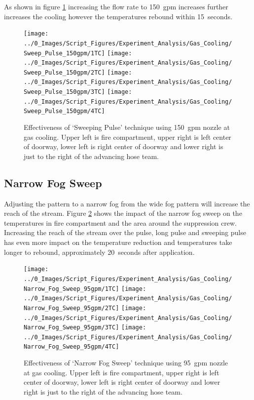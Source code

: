 \documentclass[12pt,oneside]{book}
\begin{document}
As shown in figure \ref{fig:gas_sweep_pulse_150} increasing the flow rate to 150~gpm increases further increases the cooling however the temperatures rebound within 15~seconds. 

\begin{figure}[H]
\centering
\texttt{[image: ../0\_Images/Script\_Figures/Experiment\_Analysis/Gas\_Cooling/Sweep\_Pulse\_150gpm/1TC]}
\texttt{[image: ../0\_Images/Script\_Figures/Experiment\_Analysis/Gas\_Cooling/Sweep\_Pulse\_150gpm/2TC]}
\texttt{[image: ../0\_Images/Script\_Figures/Experiment\_Analysis/Gas\_Cooling/Sweep\_Pulse\_150gpm/3TC]}
\texttt{[image: ../0\_Images/Script\_Figures/Experiment\_Analysis/Gas\_Cooling/Sweep\_Pulse\_150gpm/4TC]}
\caption[Gas Cooling - Sweeping Pulse 150~gpm]{Effectiveness of `Sweeping Pulse' technique using 150~gpm nozzle at gas cooling. Upper left is fire compartment, upper right is left center of doorway, lower left is right center of doorway and lower right is just to the right of the advancing hose team.}
\label{fig:gas_sweep_pulse_150}
\end{figure}


\subsection {Narrow Fog Sweep}
Adjusting the pattern to a narrow fog from the wide fog pattern will increase the reach of the stream. Figure \ref{fig:gas_narrow_fog_95} shows the impact of the narrow fog sweep on the temperatures in fire compartment and the area around the suppression crew. Increasing the reach of the stream over the pulse, long pulse and sweeping pulse has even more impact on the temperature reduction and temperatures take longer to rebound, approximately 20~seconds after application.

\begin{figure}[H]
\centering
\texttt{[image: ../0\_Images/Script\_Figures/Experiment\_Analysis/Gas\_Cooling/Narrow\_Fog\_Sweep\_95gpm/1TC]}
\texttt{[image: ../0\_Images/Script\_Figures/Experiment\_Analysis/Gas\_Cooling/Narrow\_Fog\_Sweep\_95gpm/2TC]}
\texttt{[image: ../0\_Images/Script\_Figures/Experiment\_Analysis/Gas\_Cooling/Narrow\_Fog\_Sweep\_95gpm/3TC]}
\texttt{[image: ../0\_Images/Script\_Figures/Experiment\_Analysis/Gas\_Cooling/Narrow\_Fog\_Sweep\_95gpm/4TC]}
\caption[Gas Cooling - Narrow Fog Sweep 95~gpm]{Effectiveness of `Narrow Fog Sweep' technique using 95~gpm nozzle at gas cooling. Upper left is fire compartment, upper right is left center of doorway, lower left is right center of doorway and lower right is just to the right of the advancing hose team.}
\label{fig:gas_narrow_fog_95}
\end{figure}
\end{document}

